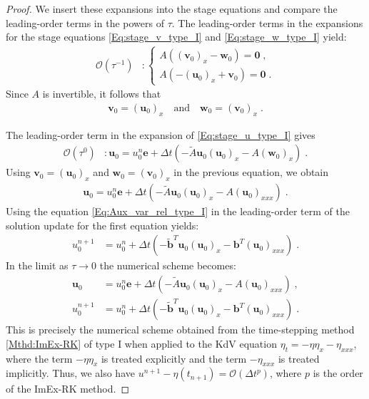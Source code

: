\documentclass{article}
\newcommand{\ukdv}{\eta}
\newcommand{\tIAex}{\tilde{A}}
\newcommand{\tIbex}{\pmb{\tilde{b}}}
\newcommand{\tIAim}{A}
\newcommand{\tIbim}{\pmb{b}}
\begin{document}
\begin{proof}
We insert these expansions into the stage equations and compare the leading-order terms in the powers of $\tau$. The leading-order terms in the expansions for the stage equations \eqref{Eq:stage_v_type_I} and \eqref{Eq:stage_w_type_I} yield:
\begin{align*}
    \mathcal{O}\left(\tau^{-1}\right) &\colon
    \begin{cases}
        \tIAim \left((\pmb{v}_0)_x - \pmb{w}_0\right) = \pmb{0} \;, \\
         \tIAim  \left(-(\pmb{u}_0)_x + \pmb{v}_0\right) = \pmb{0} \;.
    \end{cases}
\end{align*}
Since $\tIAim$ is invertible, it follows that
\begin{align}\label{Eq:Aux_var_rel_type_I}
   \pmb{v}_0 =  (\pmb{u}_0)_x \quad \text{and} \quad  \pmb{w}_0 =  (\pmb{v}_0)_x \;.
\end{align}

The leading-order term in the expansion of \eqref{Eq:stage_u_type_I} gives
\begin{align*}
    \mathcal{O}\left(\tau^{0}\right) & \colon \pmb{u}_0 = u_0^n \pmb{e} + \Delta t \left( - 	\tIAex \pmb{u}_0 (\pmb{u}_0)_x  - \tIAim(\pmb{w}_0)_x   \right)\;.
\end{align*}
Using $\pmb{v}_0 =  (\pmb{u}_0)_x$ and $\pmb{w}_0 =  (\pmb{v}_0)_x$ in the previous equation, we obtain
\begin{align}\label{Eq:Asymp_stage_u_type_I}
    \pmb{u}_0 = u_0^n \pmb{e} + \Delta t \left(- \tIAex \pmb{u}_0 (\pmb{u}_0)_x  - \tIAim(\pmb{u}_0)_{xxx} \right)\;.
\end{align}
Using the equation \eqref{Eq:Aux_var_rel_type_I} in the leading-order term of the solution update for the first equation yields:
\begin{align}\label{Eq:Asymp_sol_u_type_I}
    u_0^{n+1} &= u_0^n  + \Delta t \left( - \tIbex^T  \pmb{u}_0 (\pmb{u}_0)_x  -\tIbim^T  (\pmb{u}_0)_{xxx}  \right) \;.
\end{align}
In the limit as $\tau \to 0$ the numerical scheme becomes:
\begin{subequations}
    \begin{align*}
        \pmb{u}_0 & = u_0^n \pmb{e} + \Delta t \left(- \tIAex \pmb{u}_0 (\pmb{u}_0)_x  - \tIAim(\pmb{u}_0)_{xxx} \right)\;, \\
        u_0^{n+1} &= u_0^n  + \Delta t \left( - \tIbex^T  \pmb{u}_0 (\pmb{u}_0)_x  -\tIbim^T  (\pmb{u}_0)_{xxx}  \right) \;.
    \end{align*}
\end{subequations}
This is precisely the numerical scheme obtained from the time-stepping method \eqref{Mthd:ImEx-RK} of type I when applied to
the KdV equation $\ukdv_t = - \ukdv \ukdv_x -\ukdv_{xxx} $, where the term $-\ukdv \ukdv_x$ is treated explicitly and the term $-\ukdv_{xxx}$ is treated
implicitly. Thus, we also have $u^{n+1} - \eta(t_{n+1}) = \mathcal{O}(\Delta t^p)$, where $p$ is the order of the ImEx-RK method.


\end{proof}
\end{document}
